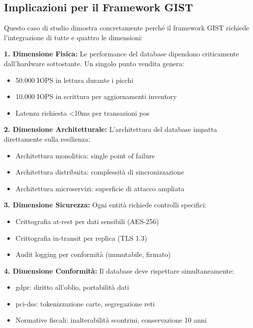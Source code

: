 \subsection{Implicazioni per il Framework GIST}
\label{subsec:implicazioni_gist}

Questo caso di studio dimostra concretamente perché il framework GIST richiede l'integrazione di tutte e quattro le dimensioni:

\textbf{1. Dimensione Fisica:} Le performance del database dipendono criticamente dall'hardware sottostante. Un singolo punto vendita genera:
\begin{itemize}
\item 50.000 IOPS in lettura durante i picchi
\item 10.000 IOPS in scrittura per aggiornamenti inventory
\item Latenza richiesta <10ms per transazioni \gls{pos}
\end{itemize}

\textbf{2. Dimensione Architetturale:} L'architettura del database impatta direttamente sulla resilienza:
\begin{itemize}
\item Architettura monolitica: single point of failure
\item Architettura distribuita: complessità di sincronizzazione
\item Architettura microservizi: superficie di attacco ampliata
\end{itemize}

\textbf{3. Dimensione Sicurezza:} Ogni entità richiede controlli specifici:
\begin{itemize}
\item Crittografia at-rest per dati sensibili (AES-256)
\item Crittografia in-transit per replica (TLS 1.3)
\item Audit logging per conformità (immutabile, firmato)
\end{itemize}

\textbf{4. Dimensione Conformità:} Il database deve rispettare simultaneamente:
\begin{itemize}
\item \gls{gdpr}: diritto all'oblio, portabilità dati
\item \gls{pci-dss}: tokenizzazione carte, segregazione reti
\item Normative fiscali: inalterabilità scontrini, conservazione 10 anni
\end{itemize}


